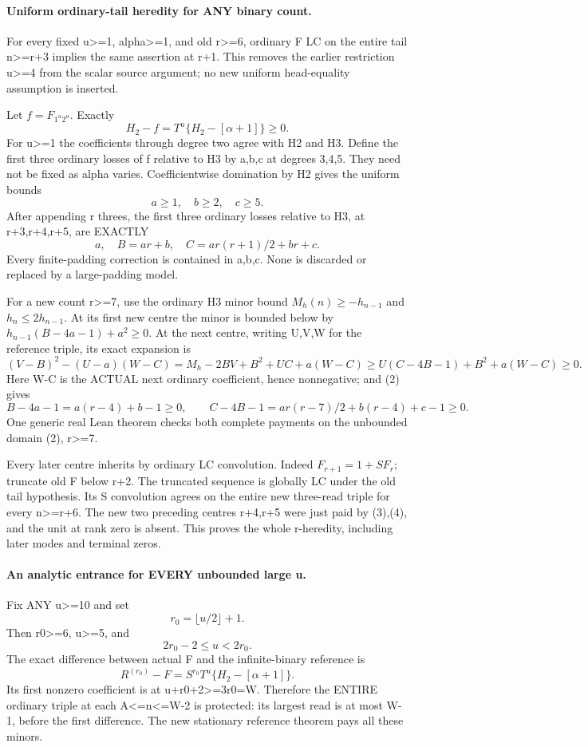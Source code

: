 \paragraph{Uniform ordinary-tail heredity for ANY binary count.}
For every fixed u>=1, alpha>=1, and old r>=6, ordinary F LC
on the entire tail n>=r+3 implies the same assertion at r+1.
This removes the earlier restriction u>=4 from the scalar source
argument; no new uniform head-equality assumption is inserted.

Let $f=F_{1^\alpha2^u}$. Exactly
\[
 H_2-f=T^u\{H_2-[\alpha+1]\}\ge0.
\]
For u>=1 the coefficients through degree two agree with H2 and H3.
Define the first three ordinary losses of f relative to H3 by
a,b,c at degrees 3,4,5. They need not be fixed as alpha varies.
Coefficientwise domination by H2 gives the uniform bounds
\[
                             a\ge1,\quad b\ge2,\quad c\ge5.
                                                               \tag{2}
\]
After appending r threes, the first three ordinary losses relative
to H3, at r+3,r+4,r+5, are EXACTLY
\[
                a,\quad B=ar+b,\quad C=ar(r+1)/2+br+c.
                                                               \tag{3}
\]
Every finite-padding correction is contained in a,b,c. None is
discarded or replaced by a large-padding model.

For a new count r>=7, use the ordinary H3 minor bound
$M_h(n)\ge-h_{n-1}$ and $h_n\le2h_{n-1}$. At its first
new centre the minor is bounded below by
$h_{n-1}(B-4a-1)+a^2\ge0$. At the next centre, writing
U,V,W for the reference triple, its exact expansion is
\[
 (V-B)^2-(U-a)(W-C)
   =M_h-2BV+B^2+UC+a(W-C)
   \ge U(C-4B-1)+B^2+a(W-C)\ge0.
\]
Here W-C is the ACTUAL next ordinary coefficient, hence nonnegative;
and (2) gives
\[
 B-4a-1=a(r-4)+b-1\ge0,\qquad
 C-4B-1=ar(r-7)/2+b(r-4)+c-1\ge0.               \tag{4}
\]
One generic real Lean theorem checks both complete payments on
the unbounded domain (2), r>=7.

Every later centre inherits by ordinary LC convolution. Indeed
$F_{r+1}=1+S F_r$; truncate old F below r+2. The truncated
sequence is globally LC under the old tail hypothesis. Its S
convolution agrees on the entire new three-read triple for every
n>=r+6. The new two preceding centres r+4,r+5 were just paid
by (3),(4), and the unit at rank zero is absent. This proves
the whole r-heredity, including later modes and terminal zeros.

\paragraph{An analytic entrance for EVERY unbounded large u.}
Fix ANY u>=10 and set
\[
                             r_0=\lfloor u/2\rfloor+1.
\]
Then r0>=6, u>=5, and
\[
                     2r_0-2\le u<2r_0.
\]
The exact difference between actual F and the infinite-binary
reference is
\[
 R^{(r_0)}-F=S^{r_0}T^u\{H_2-[\alpha+1]\}.
\]
Its first nonzero coefficient is at u+r0+2>=3r0=W. Therefore
the ENTIRE ordinary triple at each A<=n<=W-2 is protected:
its largest read is at most W-1, before the first difference.
The new stationary reference theorem pays all these minors.


